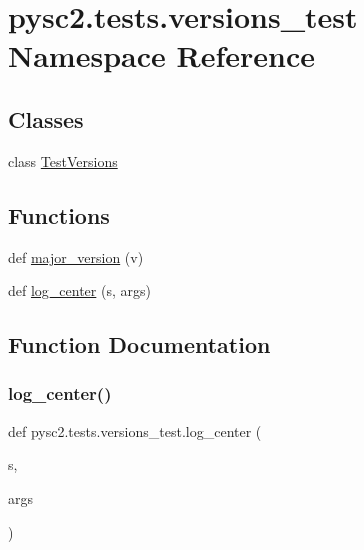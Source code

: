 \hypertarget{namespacepysc2_1_1tests_1_1versions__test}{}\section{pysc2.\+tests.\+versions\+\_\+test Namespace Reference}
\label{namespacepysc2_1_1tests_1_1versions__test}
\subsection*{Classes}
\begin{DoxyCompactItemize}
\item 
class \mbox{\hyperlink{classpysc2_1_1tests_1_1versions__test_1_1_test_versions}{Test\+Versions}}
\end{DoxyCompactItemize}
\subsection*{Functions}
\begin{DoxyCompactItemize}
\item 
def \mbox{\hyperlink{namespacepysc2_1_1tests_1_1versions__test_a04c38b0adecb6a66c38fb7a77331d89d}{major\+\_\+version}} (v)
\item 
def \mbox{\hyperlink{namespacepysc2_1_1tests_1_1versions__test_a1469a14d7fa158c74763b15e38b72efb}{log\+\_\+center}} (s, args)
\end{DoxyCompactItemize}


\subsection{Function Documentation}
\mbox{\label{namespacepysc2_1_1tests_1_1versions__test_a1469a14d7fa158c74763b15e38b72efb}} 
\subsubsection{\texorpdfstring{log\+\_\+center()}{log\_center()}}
{\footnotesize\ttfamily def pysc2.\+tests.\+versions\+\_\+test.\+log\+\_\+center (\begin{DoxyParamCaption}\item[{}]{s,  }\item[{}]{args }\end{DoxyParamCaption})}

